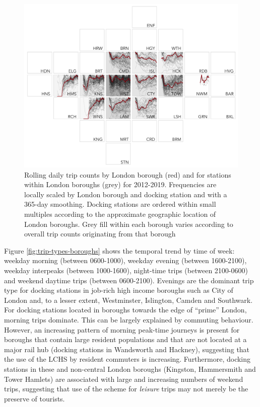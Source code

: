 \documentclass[
]{article}
\begin{document}
\begin{figure}

{\centering \includegraphics[width=1\linewidth]{figures/daily_hires_station_bor_minor} 

}

\caption{Rolling daily trip counts by London borough (red) and for stations within London boroughs (grey) for 2012-2019. Frequencies are locally scaled by London borough and docking station and with a 365-day smoothing. Docking stations are ordered within small multiples according to the approximate geographic location of London boroughs. Grey fill within each borough varies according to overall trip counts originating from that borough}\label{fig:change-time-boroughs}
\end{figure}

Figure \ref{fig:trip-types-boroughs} shows the temporal trend by time of week: weekday morning (between 0600-1000), weekday evening (between 1600-2100), weekday interpeaks (between 1000-1600), night-time trips (between 2100-0600) and weekend daytime trips (between 0600-2100). Evenings are the dominant trip type for docking stations in job-rich high income boroughs such as City of London and, to a lesser extent, Westminster, Islington, Camden and Southwark.
For docking stations located in boroughs towards the edge of ``prime'' London, morning trips dominate.
This can be largely explained by commuting behaviour.
However, an increasing pattern of morning peak-time journeys is present for boroughs that contain large resident populations and that are not located at a major rail hub (docking stations in Wandsworth and Hackney), suggesting that the use of the LCHS by resident commuters is increasing.
Furthermore, docking stations in these and non-central London boroughs (Kingston, Hammersmith and Tower Hamlets) are associated with large and increasing numbers of weekend trips, suggesting that use of the scheme for \emph{leisure} trips may not merely be the preserve of tourists.
\end{document}
